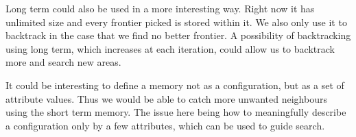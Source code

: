 Long term could also be used in a more interesting way. Right now it has unlimited size and every frontier picked is stored within it. We also only use it to backtrack in the case that we find no better frontier. A possibility of backtracking using long term, which increases at each iteration, could allow us to backtrack more and search new areas. 

It could be interesting to define a memory not as a configuration, but as a set of attribute values. Thus we would be able to catch more unwanted neighbours using the short term memory. The issue here being how to meaningfully describe a configuration only by a few attributes, which can be used to guide search. 


